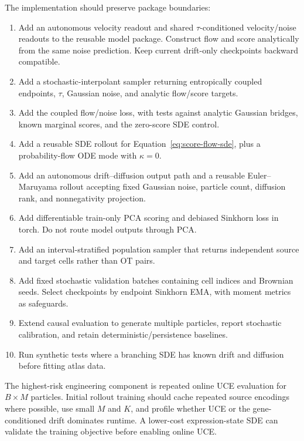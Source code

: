 \documentclass[11pt]{article}
\newcommand{\uce}{UCE}
\begin{document}
The implementation should preserve package boundaries:
\begin{enumerate}
  \item Add an autonomous velocity readout and shared $\tau$-conditioned
        velocity/noise readouts to the reusable model package. Construct flow
        and score analytically from the same noise prediction. Keep current
        drift-only checkpoints backward compatible.
  \item Add a stochastic-interpolant sampler returning entropically coupled
        endpoints, $\tau$, Gaussian noise, and analytic flow/score targets.
  \item Add the coupled flow/noise loss, with tests against analytic Gaussian
        bridges, known marginal scores, and the zero-score SDE control.
  \item Add a reusable SDE rollout for Equation~\ref{eq:score-flow-sde}, plus a
        probability-flow ODE mode with $\kappa=0$.
  \item Add an autonomous drift--diffusion output path and a reusable
        Euler--Maruyama rollout accepting fixed Gaussian noise,
        particle count, diffusion rank, and nonnegativity projection.
  \item Add differentiable train-only PCA scoring and debiased Sinkhorn loss in
        torch. Do not route model outputs through PCA.
  \item Add an interval-stratified population sampler that returns independent
        source and target cells rather than OT pairs.
  \item Add fixed stochastic validation batches containing cell indices and
        Brownian seeds. Select checkpoints by endpoint Sinkhorn EMA, with
        moment metrics as safeguards.
  \item Extend causal evaluation to generate multiple particles, report
        stochastic calibration, and retain deterministic/persistence baselines.
  \item Run synthetic tests where a branching SDE has known drift and diffusion
        before fitting atlas data.
\end{enumerate}

The highest-risk engineering component is repeated online \uce{} evaluation
for $B\times M$ particles. Initial rollout training should cache repeated source
encodings where possible, use small $M$ and $K$, and profile whether \uce{} or
the gene-conditioned drift dominates runtime. A lower-cost expression-state
SDE can validate the training objective before enabling online \uce{}.
\end{document}
